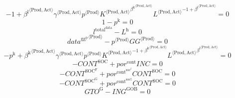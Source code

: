 \begin{equation}
-1 + {{\beta^{\mathrm{l}}}^{\langle \mathrm{\mathrm{Prod}},\mathrm{\mathrm{Act}}\rangle}} {{\gamma}^{\langle \mathrm{\mathrm{Prod}},\mathrm{\mathrm{Act}}\rangle}} {{p}^{\langle \mathrm{Prod}\rangle}} {{{K}^{\langle \mathrm{Prod},\mathrm{Act}\rangle}}^{{\beta^{\mathrm{k}}}^{\langle \mathrm{\mathrm{Prod}},\mathrm{\mathrm{Act}}\rangle}}} {{{L}^{\langle \mathrm{Prod},\mathrm{Act}\rangle}}^{-1 + {\beta^{\mathrm{l}}}^{\langle \mathrm{\mathrm{Prod}},\mathrm{\mathrm{Act}}\rangle}}} = 0
\end{equation}
\begin{equation}
1 - p^{\mathrm{k}} = 0
\end{equation}
\begin{equation}
l^{\mathrm{total}^{\mathrm{data}}} - L^{\mathrm{h}} = 0
\end{equation}
\begin{equation}
{{d\!a\!t\!a}^{\mathrm{gg}^{\mathrm{p}}}}^{\langle \mathrm{\mathrm{Prod}}\rangle} - {{p}^{\langle \mathrm{Prod}\rangle}} {{{G\!G}}^{\langle \mathrm{Prod}\rangle}} = 0
\end{equation}
\begin{equation}
-p^{\mathrm{k}} + {{\beta^{\mathrm{k}}}^{\langle \mathrm{\mathrm{Prod}},\mathrm{\mathrm{Act}}\rangle}} {{\gamma}^{\langle \mathrm{\mathrm{Prod}},\mathrm{\mathrm{Act}}\rangle}} {{p}^{\langle \mathrm{Prod}\rangle}} {{{K}^{\langle \mathrm{Prod},\mathrm{Act}\rangle}}^{-1 + {\beta^{\mathrm{k}}}^{\langle \mathrm{\mathrm{Prod}},\mathrm{\mathrm{Act}}\rangle}}} {{{L}^{\langle \mathrm{Prod},\mathrm{Act}\rangle}}^{{\beta^{\mathrm{l}}}^{\langle \mathrm{\mathrm{Prod}},\mathrm{\mathrm{Act}}\rangle}}} = 0
\end{equation}
\begin{equation}
-{C\!O\!N\!T}^{\mathrm{SOC}} + {{p\!o\!r}^{\mathrm{cont}}} {{I\!N\!C}} = 0
\end{equation}
\begin{equation}
-{C\!O\!N\!T}^{\mathrm{SOC}^{\mathrm{F}}} + {{p\!o\!r}^{\mathrm{cont}^{\mathrm{soc}^{\mathrm{f}}}}} {{C\!O\!N\!T}^{\mathrm{SOC}}} = 0
\end{equation}
\begin{equation}
-{C\!O\!N\!T}^{\mathrm{SOC}^{\mathrm{G}}} + {{p\!o\!r}^{\mathrm{cont}^{\mathrm{soc}^{\mathrm{g}}}}} {{C\!O\!N\!T}^{\mathrm{SOC}}} = 0
\end{equation}
\begin{equation}
{G\!T\!O}^{\mathrm{G}} - {I\!N\!G}^{\mathrm{GOB}} = 0
\end{equation}
